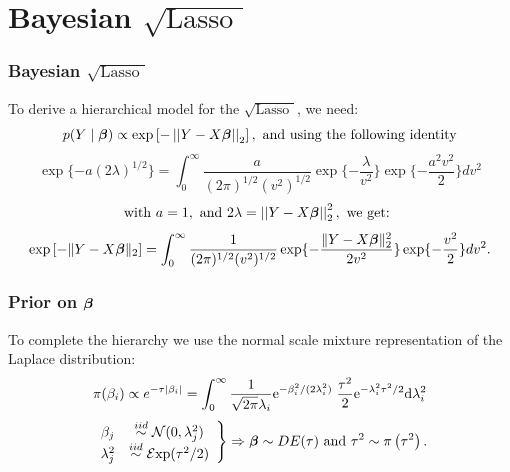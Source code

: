 \documentclass[10pt]{beamer}
\theoremstyle{plain}
\newcommand{\blankline}{\quad\pagebreak[3]}
\def\sql{$\sqrt{\text{Lasso }}$}
\begin{document}
\section{Bayesian \sql}

\begin{frame}
	\frametitle{Bayesian \sql}
	To derive a hierarchical model for the \sql, we need: $$p(Y \mid \boldsymbol{\beta}) \propto \exp \left[- \left|\left|Y - X \boldsymbol{\beta} \right|\right|_2 \right], \ \text{and using the following identity}$$  
$$\exp \{-a(2\lambda)^{1/2}\}  = \int_0^\infty \frac{a}{(2\pi)^{1/2} (v^2)^{1/2}}  \exp\{-\frac{\lambda}{v^2}\} \exp\{-\frac{a^2 v^2}{2}\} dv^2$$
	$$\text{with }a = 1,\ \text{and } 2\lambda = \left|\left| Y - X\boldsymbol{\beta}\right|\right|_2^2, \ \text{we get: }$$
	$$\exp \left[ - \lVert Y - X\boldsymbol{\beta}\rVert_2 \right]  =  \int_0^\infty \frac{1}{(2\pi)^{1/2} (v^2)^{1/2}} \exp\{-\frac{ \lVert Y - X\boldsymbol{\beta}\rVert_2^2}{2v^2}\} \exp\{-\frac{v^2}{2}\} dv^2.$$  
	
\end{frame}

\begin{frame}
	\frametitle{Prior on $\boldsymbol{\beta}$}
	To complete the hierarchy we use the normal scale mixture representation of the Laplace distribution:
	$$ \pi(\beta_i) \propto e^{-\tau \lvert\beta_i\rvert} = \int_{0}^{\infty} \frac{1}{\sqrt{2\pi} \lambda_i} {\rm e}^{-\beta_i^2/(2\lambda_i^2)} \; \frac{\tau^2}{2} {\rm e}^{-\lambda_i^2\tau^2/2} {\rm d} \lambda_i^2 $$
	\blankline
	\begin{equation*} %
\left.
\begin{array}{cc}
\beta_j & \stackrel{iid}{\sim} \NormRV(0 , \lambda_j^2) \\
\lambda_j^2 & \stackrel{iid}{\sim} \mathcal{E}\mathrm{xp}(\tau^2/2) 
\end{array} \right \} \Rightarrow
\bbeta \sim DE(\tau) \text{ and } \tau^2 \sim \pi \left(\tau^2 \right). 
\end{equation*}
\end{frame}
\end{document}
